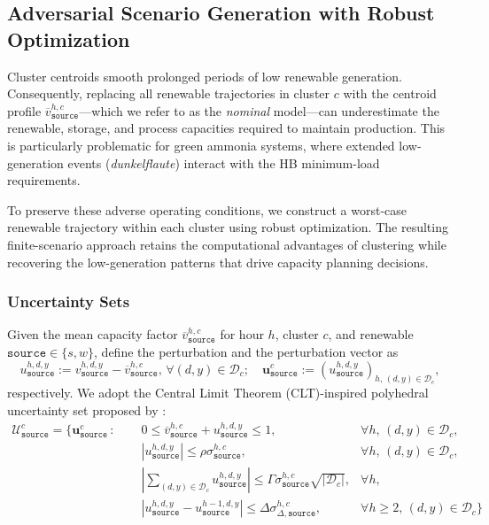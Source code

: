 \documentclass[11pt, letter]{article}
\begin{document}
\subsection{Adversarial Scenario Generation with Robust Optimization}\label{section:strategic-robust}
Cluster centroids smooth prolonged periods of low renewable generation. Consequently, replacing all renewable trajectories in cluster $c$ with the centroid profile $\overline{v}^{h,c}_{\texttt{source}}$---which we refer to as the \emph{nominal} model---can underestimate the renewable, storage, and process capacities required to maintain production. This is particularly problematic for green ammonia systems, where extended low-generation events (\emph{dunkelflaute}) interact with the HB minimum-load requirements.

To preserve these adverse operating conditions, we construct a worst-case renewable trajectory within each cluster using robust optimization. The resulting finite-scenario approach retains the computational advantages of clustering while recovering the low-generation patterns that drive capacity planning decisions.
\subsubsection{Uncertainty Sets}

Given the mean capacity factor \( \overline{v}_\texttt{source}^{h,c} \) for hour \( h \), cluster \( c \), and renewable \( \texttt{source} \in \{s,w\} \), define the perturbation and the perturbation vector as
\[
u_\texttt{source}^{h,d,y} := v_\texttt{source}^{h,d,y} - \overline{v}_\texttt{source}^{h,c},\, \forall  (d,y) \in \mathcal{D}_c; \quad \boldsymbol{u}^c_\texttt{source} := (u^{h,d,y}_\texttt{source})_{h,\,(d,y)\in \mathcal{D}_c},
\]
respectively. We adopt the Central Limit Theorem (CLT)-inspired polyhedral uncertainty set proposed by \cite{bertsimas_decarbonizing_2023}:
\begin{subequations} \label{eq:clt-uncertainty}
\begin{align}
\mathcal{U}^{c}_{\texttt{source}} = \Big\{ \boldsymbol{u}^c_\texttt{source} \,:\;
    & \quad 0 \le \overline{v}^{h,c}_{\texttt{source}} + u^{h,d,y}_{\texttt{source}} \le 1, & \forall h ,\,(d,y) \in \mathcal{D}_c,
    \label{eq:clt-capacity-bound} \\
    & \quad \left|u^{h,d,y}_{\texttt{source}}\right| \le \rho \sigma^{h,c}_{\texttt{source}},  &\forall h ,\,(d,y) \in \mathcal{D}_c,
    \label{eq:clt-hourly-box} \\
    & \quad \left| \sum_{(d,y) \in \mathcal{D}_c} u^{h,d,y}_{\texttt{source}} \right| \le \Gamma \sigma^{h,c}_{\texttt{source}} \sqrt{|\mathcal{D}_c|}, & \forall h,
        & \label{eq:clt-clt} \\ & \quad \left| u^{h,d,y}_{\texttt{source}} - u^{h-1,d,y}_{\texttt{source}} \right| \le \Delta \sigma^{h,c}_{\Delta,\texttt{source}}, &\forall h \ge 2,\,(d,y) \in \mathcal{D}_c\label{eq:clt-smooth}  \Big\}
\end{align}
\end{subequations}
\end{document}
